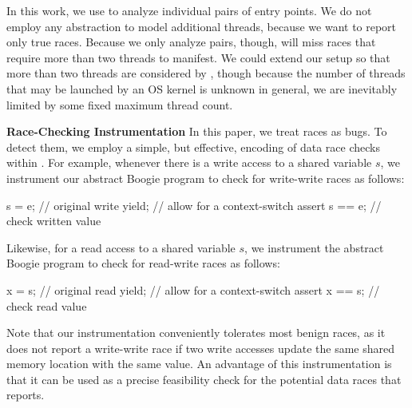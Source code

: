 In this work, we use \corral to analyze individual pairs of entry points.
We do not employ any abstraction to model additional threads, because we want \corral to report only true races. Because we only analyze pairs, though, \corral will miss races that require more than two threads to manifest.
We could extend our setup so that more than two threads are considered by \corral, though because the number of threads that may be launched by an OS kernel is unknown in general, we are inevitably limited by some fixed maximum thread count.

\noindent\textbf{Race-Checking Instrumentation }
%
In this paper, we treat races as bugs. To detect them, we employ a simple, but effective, encoding of data race checks within \corral. For example, whenever there is a write access to a shared variable $s$, we instrument our abstract Boogie program to check for write-write races as follows:
%
\begin{boogie}
s = e;         // original write
yield;         // allow for a context-switch
assert s == e; // check written value
\end{boogie}
%
Likewise, for a read access to a shared variable $s$, we instrument the abstract Boogie program to check for read-write races as follows:
%
\begin{boogie}
x = s;         // original read
yield;         // allow for a context-switch
assert x == s; // check read value
\end{boogie}

Note that our instrumentation conveniently tolerates most benign races, as it does not report a write-write race if two write accesses update the same shared memory location with the same value.  An advantage of this instrumentation is that it can be used as a precise feasibility check for the potential data races that \whoop reports.
